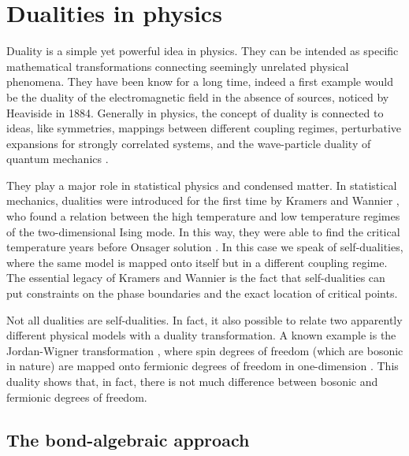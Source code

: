 \section{Dualities in physics}%
\label{sec:dualities_in_physics}


Duality is a simple yet powerful idea in physics.
They can be intended as specific mathematical transformations connecting seemingly unrelated physical phenomena.
They have been know for a long time, indeed a first example would be the duality of the electromagnetic field in the absence of sources, noticed by Heaviside in 1884.
Generally in physics, the concept of duality is connected to ideas, like symmetries, mappings between different coupling regimes, perturbative expansions for strongly correlated systems, and the wave-particle duality of quantum mechanics \cite{savit1980duality, cobanera2011bond}.

They play a major role in statistical physics and condensed matter.
In statistical mechanics, dualities were introduced for the first time by Kramers and Wannier \cite{kramers1941statistics}, who found a relation between the high temperature and low temperature regimes of the two-dimensional Ising mode.
In this way, they were able to find the critical temperature years before Onsager solution \cite{onsager1944ising}.
In this case we speak of self-dualities, where the same model is mapped onto itself but in a different coupling regime.
The essential legacy of Kramers and Wannier is the fact that self-dualities can put constraints on the phase boundaries and the exact location of critical points.

Not all dualities are self-dualities.
In fact, it also possible to relate two apparently different physical models with a duality transformation.
A known example is the Jordan-Wigner transformation \cite{schultz1964ising, jordan1928pauli}, where spin degrees of freedom (which are bosonic in nature) are mapped onto fermionic degrees of freedom in one-dimension .
This duality shows that, in fact, there is not much difference between bosonic and fermionic degrees of freedom.


%
%
\subsection{The bond-algebraic approach}
\label{sub:the_bond_algebraic_approach}

